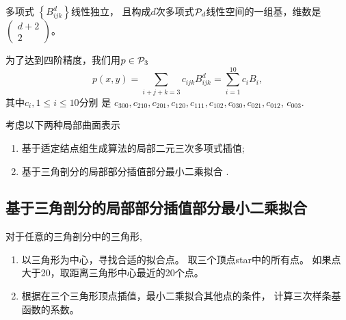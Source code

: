 \begin{lem}
  多项式 $\left\{ B^d_{ijk}\right\}$线性独立，
  且构成$d$次多项式${\cal P}_d$线性空间的一组基，维数是
  $\begin{pmatrix}
    d+2\\ 2
  \end{pmatrix}$。
\end{lem}


\begin{rem}
  为了达到四阶精度，我们用$p\in {\cal P}_3$
  \begin{displaymath}
    p(x,y)=\sum_{i+j+k=3}c_{ijk}B_{ijk}^d=\sum_{i=1}^{10}c_iB_i,
  \end{displaymath}
  其中$c_i,1\leq i\leq 10$分别
  是
  $c_{300},c_{210},c_{201},c_{120},c_{111},c_{102},c_{030},c_{021},c_{012}$,
  $c_{003}$.
\end{rem}



\begin{rem}
  考虑以下两种局部曲面表示
  \begin{enumerate}
  \item 基于适定结点组生成算法的局部二元三次多项式插值\cite{ShaoThesis};
  \item 基于三角剖分的局部部分插值部分最小二乘拟合
    \cite{schumaker2015spline}.
  \end{enumerate}
\end{rem}

\subsection{基于三角剖分的局部部分插值部分最小二乘拟合}
\label{sec:局部三次样条曲面}
\begin{defn}[算法]\cite{schumaker2015spline}
  对于任意的三角剖分中的三角形,
\begin{enumerate}
\item 以三角形为中心，寻找合适的拟合点。
  取三个顶点star中的所有点。
  如果点大于20，取距离三角形中心最近的20个点。
\item 根据在三个三角形顶点插值，最小二乘拟合其他点的条件，
  计算三次样条基函数的系数。
\end{enumerate}
\end{defn}


